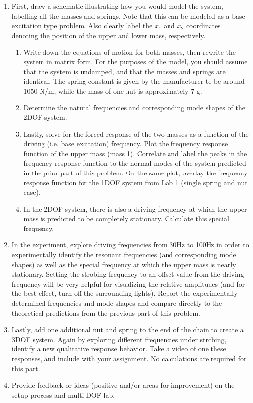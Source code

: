 \documentclass[12pt,letterpaper,english]{article}
\begin{document}
\begin{enumerate}
\item First, draw a schematic illustrating how you would model the system, labelling all the masses and springs. Note that this can be modeled as a base excitation type problem.  Also clearly label the $x_1$ and $x_2$ coordinates denoting the position of the upper and lower mass, respectively.  
\begin{enumerate}
\item Write down the equations of motion for both masses, then rewrite the system in matrix form. For the purposes of the model, you should assume that the system is undamped, and that the masses and springs are identical.  The spring constant is given by the manufacturer to be around 1050 N/m, while the mass of one nut is approximately 7 g. 
\item Determine the natural frequencies and corresponding mode shapes of the 2DOF system.
\item Lastly, solve for the forced response of the two masses as a function of the driving (i.e. base excitation) frequency.  Plot the frequency response function of the upper mass (mass 1).  Correlate and label the peaks in the frequency response function to the normal modes of the system predicted in the prior part of this problem.  On the same plot, overlay the frequency response function for the 1DOF system from Lab 1 (single spring and nut case).
\item In the 2DOF system, there is also a driving frequency at which the upper mass is predicted to be completely stationary.  Calculate this special frequency.
\end{enumerate}

\item In the experiment, explore driving frequencies from 30Hz to 100Hz in order to experimentally identify the resonant frequencies (and corresponding mode shapes) as well as the special frequency at which the upper mass is nearly stationary.  Setting the strobing frequency to an offset value from the driving frequency will be very helpful for visualizing the relative amplitudes (and for the best effect, turn off the surrounding lights).  Report the experimentally determined frequencies and mode shapes and compare directly to the theoretical predictions from the previous part of this problem.  

\item Lastly, add one additional nut and spring to the end of the chain to create a 3DOF system.  Again by exploring different frequencies under strobing, identify a new qualitative response behavior.  Take a video of one these responses, and include with your assignment.  No calculations are required for this part.

\item Provide feedback or ideas (positive and/or areas for improvement) on the setup process and multi-DOF lab.

\end{enumerate}
\end{document}
